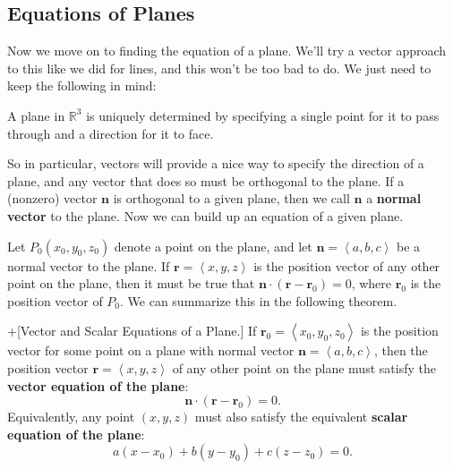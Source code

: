 \documentclass[10pt,]{book}
\newcommand{\terminology}[1]{\textbf{#1}}
\theoremstyle{ptxplainnotitle}
\theoremstyle{ptxplaintitle}
\theoremstyle{ptxplainnotitle}
\theoremstyle{ptxplaintitle}
\theoremstyle{ptxplainnotitle}
\theoremstyle{ptxplaintitle}
\theoremstyle{ptxdefinitionnotitle}
\theoremstyle{ptxdefinitiontitle}
\theoremstyle{ptxdefinitionnotitle}
\theoremstyle{ptxdefinitiontitle}
\theoremstyle{ptxdefinitionnotitle}
\theoremstyle{ptxdefinitiontitle}
\theoremstyle{ptxdefinitionnotitle}
\theoremstyle{ptxdefinitiontitle}
\theoremstyle{ptxdefinitionnotitle}
\theoremstyle{ptxdefinitiontitle}
\numberwithin{equation}{section}
\newcommand{\RR}{\mathbb{R}}
\newcommand{\vv}[1]{\mathbf{#1}}
\newcommand{\dotprod}[1]{\left\langle #1 \right\rangle}
\begin{document}
\subsection[{Equations of Planes}]{Equations of Planes}\label{subsection-equations-of-planes}
\hypertarget{p-872}{}%
Now we move on to finding the equation of a plane. We'll try a vector approach to this like we did for lines, and this won't be too bad to do. We just need to keep the following in mind:%
\begin{observation}\label{observation-vectors-and-planes}
\hypertarget{p-873}{}%
A plane in \(\RR^{3}\) is uniquely determined by specifying a single point for it to pass through and a direction for it to face.%
\end{observation}
\hypertarget{p-874}{}%
So in particular, vectors will provide a nice way to specify the direction of a plane, and any vector that does so must be orthogonal to the plane. If a (nonzero) vector \(\vv{n}\) is orthogonal to a given plane, then we call \(\vv{n}\) a \terminology{normal vector} to the plane. Now we can build up an equation of a given plane.%
\par
\hypertarget{p-875}{}%
Let \(P_{0}(x_{0},y_{0},z_{0})\) denote a point on the plane, and let \(\vv{n} = \dotprod{a,b,c}\) be a normal vector to the plane. If \(\vv{r}=\dotprod{x,y,z}\) is the position vector of any other point on the plane, then it must be true that \(\vv{n}\cdot(\vv{r}-\vv{r}_{0}) = 0\), where \(\vv{r}_{0}\) is the position vector of \(P_{0}\). We can summarize this in the following theorem.%
\begin{theorem}+[{Vector and Scalar Equations of a Plane.}]\label{theorem-vector-and-scalar-equations-of-a-plane}
\hypertarget{p-876}{}%
If \(\vv{r}_{0} = \dotprod{x_{0},y_{0},z_{0}}\) is the position vector for some point on a plane with normal vector \(\vv{n} = \dotprod{a,b,c}\), then the position vector \(\vv{r} = \dotprod{x,y,z}\) of any other point on the plane must satisfy the \terminology{vector equation of the plane}:%
%
\begin{equation*}
\vv{n}\cdot(\vv{r}-\vv{r}_{0}) = 0.
\end{equation*}
\hypertarget{p-877}{}%
Equivalently, any point \((x,y,z)\) must also satisfy the equivalent \terminology{scalar equation of the plane}:%
%
\begin{equation*}
a(x-x_{0})+b(y-y_{0})+c(z-z_{0}) = 0.
\end{equation*}
\end{theorem}
\end{document}
